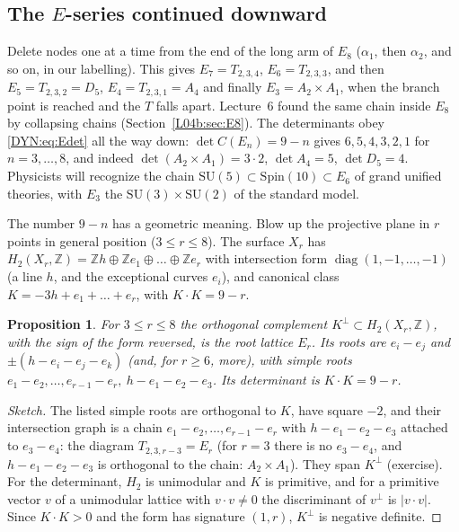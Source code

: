 \documentclass[11pt,openany]{book}
\theoremstyle{plain}
\newtheorem{proposition}[theorem]{Proposition}
\theoremstyle{definition}
\theoremstyle{remark}
\newcommand{\Z}{\mathbb{Z}}
\newcommand{\abs}[1]{\left\lvert #1 \right\rvert}
\begin{document}
\subsection*{The $E$-series continued downward}
Delete nodes one at a time from the end of the long arm of $E_8$ ($\alpha_1$, then $\alpha_2$, and so on, in
our labelling). This gives $E_7=T_{2,3,4}$, $E_6=T_{2,3,3}$, and then $E_5=T_{2,3,2}=D_5$, $E_4=T_{2,3,1}=A_4$ and finally
$E_3=A_2\times A_1$, when the branch point is reached and the $T$ falls apart. Lecture~6 found the same
chain inside $E_8$ by collapsing chains (Section~\ref{L04b:sec:E8}). The determinants obey
\eqref{DYN:eq:Edet} all the way down: $\det C(E_n)=9-n$ gives $6,5,4,3,2,1$ for $n=3,\dots,8$, and
indeed $\det(A_2\times A_1)=3\cdot2$, $\det A_4=5$, $\det D_5=4$. Physicists will recognize the chain
$\mathrm{SU}(5)\subset\mathrm{Spin}(10)\subset E_6$ of grand unified theories, with $E_3$ the
$\mathrm{SU}(3)\times\mathrm{SU}(2)$ of the standard model.

The number $9-n$ has a geometric meaning. Blow up the projective plane in $r$ points in general position
($3\le r\le8$). The surface $X_r$ has $H_2(X_r,\Z)=\Z h\oplus\Z e_1\oplus\dots\oplus\Z e_r$ with intersection
form $\operatorname{diag}(1,-1,\dots,-1)$ (a line $h$, and the exceptional curves $e_i$), and canonical class
$K=-3h+e_1+\dots+e_r$, with $K\cdot K=9-r$.

\begin{proposition}\label{DYN:prop:delpezzo}
For $3\le r\le8$ the orthogonal complement $K^\perp\subset H_2(X_r,\Z)$, with the sign of the form reversed,
is the root lattice $E_r$. Its roots are $e_i-e_j$ and $\pm(h-e_i-e_j-e_k)$ (and, for $r\ge6$, more), with
simple roots $e_1-e_2,\dots,e_{r-1}-e_r,\ h-e_1-e_2-e_3$. Its determinant is $K\cdot K=9-r$.
\end{proposition}

\begin{proof}[Sketch]
The listed simple roots are orthogonal to $K$, have square $-2$, and their intersection graph is a chain
$e_1-e_2,\dots,e_{r-1}-e_r$ with $h-e_1-e_2-e_3$ attached to $e_3-e_4$: the diagram $T_{2,3,r-3}=E_r$
(for $r=3$ there is no $e_3-e_4$, and $h-e_1-e_2-e_3$ is orthogonal to the chain: $A_2\times A_1$).
They span $K^\perp$ (exercise). For the determinant, $H_2$ is unimodular and $K$ is primitive, and for a
primitive vector $v$ of a unimodular lattice with $v\cdot v\ne0$ the discriminant of $v^\perp$ is
$\abs{v\cdot v}$. Since $K\cdot K>0$ and the form has signature $(1,r)$, $K^\perp$ is negative definite.
\end{proof}
\end{document}
